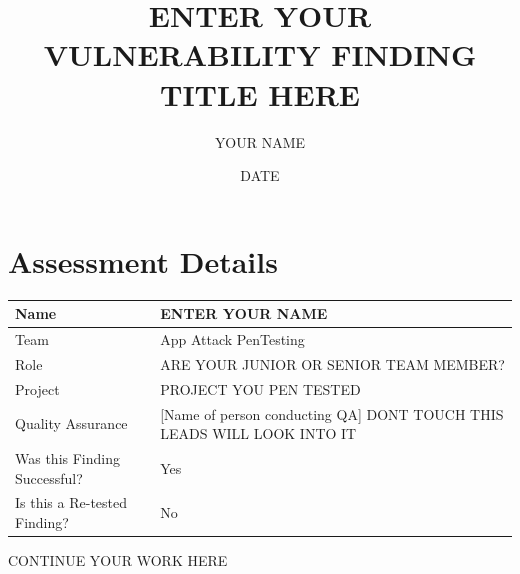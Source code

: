 \documentclass{article}
\title{ENTER YOUR VULNERABILITY FINDING TITLE HERE}
\author{YOUR NAME}
\date{DATE}
\begin{document}
\maketitle


\section*{Assessment Details}

\begin{tabular}{|p{5cm}|p{7.5cm}|}
\hline
Name & ENTER YOUR NAME \\ \hline
Team & App Attack PenTesting \\ \hline
Role & ARE YOUR JUNIOR OR SENIOR TEAM MEMBER? \\ \hline
Project & PROJECT YOU PEN TESTED \\ \hline
Quality Assurance & [Name of person conducting QA] DONT TOUCH THIS LEADS WILL LOOK INTO IT \\ \hline
Was this Finding Successful? & Yes \\ \hline
Is this a Re-tested Finding? & No \\ \hline
\end{tabular}


CONTINUE YOUR WORK HERE\\
\end{document}
